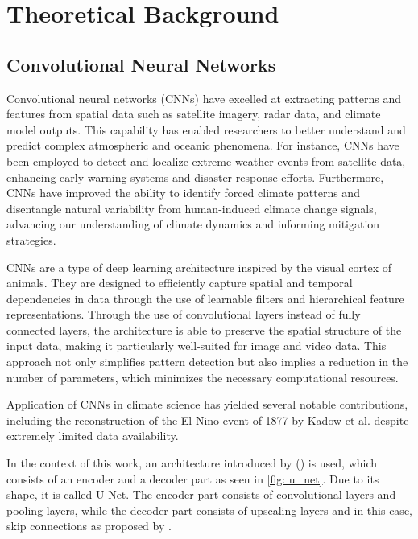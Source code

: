 \section{Theoretical Background}
\label{sec: theory}

\subsection{Convolutional Neural Networks}
\label{subsec:cnn}

Convolutional neural networks (CNNs) have excelled at extracting patterns and features from spatial data such as satellite imagery, radar data, and climate model outputs. This capability has enabled researchers to better understand and predict complex atmospheric and oceanic phenomena. For instance, CNNs have been employed to detect and localize extreme weather events from satellite data, enhancing early warning systems and disaster response efforts. Furthermore, CNNs have improved the ability to identify forced climate patterns and disentangle natural variability from human-induced climate change signals, advancing our understanding of climate dynamics and informing mitigation strategies.


CNNs are a type of deep learning architecture inspired by the visual cortex of animals. They are designed to efficiently capture spatial and temporal dependencies in data through the use of learnable filters and hierarchical feature representations. Through the use of convolutional layers instead of fully connected layers, the architecture is able to preserve the spatial structure of the input data, making it particularly well-suited for image and video data. This approach not only simplifies pattern detection but also implies a reduction in the number of parameters, which minimizes the necessary computational resources.

Application of CNNs in climate science has yielded several notable contributions, including the reconstruction of the El Nino event of 1877 by Kadow et al. despite extremely limited data availability. \cite{kadow2020}

In the context of this work, an architecture introduced by (\cite{ronneberger2015}) is used, which consists of an encoder and a decoder part as seen in \autoref{fig: u_net}. Due to its shape, it is called U-Net. The encoder part consists of convolutional layers and pooling layers, while the decoder part consists of upscaling layers and in this case, skip connections as proposed by \cite{liu2018inpaining}.

